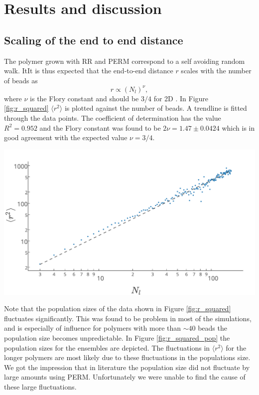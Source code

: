 \section{Results and discussion}

\subsection{Scaling of the end to end distance}
The polymer grown with RR and PERM correspond to a self avoiding random walk. ItIt is thus expected that the end-to-end distance $r$ scales with the number of beads as 
\begin{equation*}
    r \propto \left(N_l\right)^\nu,
\end{equation*} where $\nu$ is the Flory constant and should be $3/4$ for 2D \cite{jmt}. In Figure \ref{fig:r_squared} $\langle r^2\rangle$ is plotted against the number of beads. A trendline is fitted through the data points. The coefficient of determination has the value $R^2 = 0.952$ and the Flory constant was found to be $2\nu = 1.47 \pm 0.0424$ which is in good agreement with the expected value $\nu=3/4$.
\begin{Figure}
    \centering
    \includegraphics[width=\linewidth]{r_squared.pdf}
    \label{fig:r_squared}
\end{Figure}

Note that the population sizes of the data shown in Figure \ref{fig:r_squared} fluctuates significantly. This was found to be problem in most of the simulations, and is especially of influence for polymers with more than $\sim 40$ beads the population size becomes unpredictable. In Figure \ref{fig:r_squared_pop} the population sizes for the ensembles are depicted. The fluctuations in $\langle r^2 \rangle$ for the longer polymers are most likely due to these fluctuations in the populations size. We got the impression that in literature the population size did not fluctuate by large amounts using PERM. Unfortunately we were unable to find the cause of these large fluctuations.

